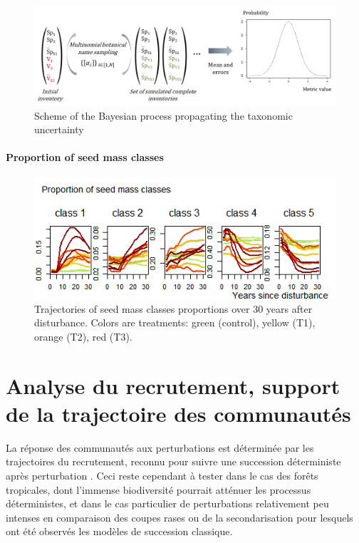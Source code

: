 \documentclass[
  11pt,
  french,
  A4paper,
  extrafontsizes,onecolumn,openright
  ]{memoir}
\begin{document}
\begin{figure}[h]

{\centering \includegraphics[width=1\linewidth]{ExternalFig/BayesianSheme} 

}

\caption{Scheme of the Bayesian process propagating the taxonomic uncertainty}\label{fig:FigBayesianScheme2}
\end{figure}

\subsubsection{Proportion of seed mass
classes}\label{proportion-of-seed-mass-classes}

\begin{figure}[h]

{\centering \includegraphics[width=0.8\linewidth]{ExternalFig/SeedMassClasses} 

}

\caption{Trajectories of seed mass classes proportions over 30 years after disturbance. Colors are treatments: green (control), yellow (T1), orange (T2), red (T3).}\label{fig:FigSeedMassClasses}
\end{figure}

\chapter{Analyse du recrutement, support de la trajectoire des
communautés}\label{analyse-du-recrutement-support-de-la-trajectoire-des-communautes}

La réponse des communautés aux perturbations est déterminée par les
trajectoires du recrutement, reconnu pour suivre une succession
déterministe après perturbation
\autocites[@][]{Clements1916}{Denslow2000}. Ceci reste cependant à
tester dans le cas des forêts tropicales, dont l'immense biodiversité
pourrait atténuer les processus déterministes, et dans le cas
particulier de perturbations relativement peu intenses en comparaison
des coupes rases ou de la secondarisation pour lesquels ont été observés
les modèles de succession classique.
\end{document}

